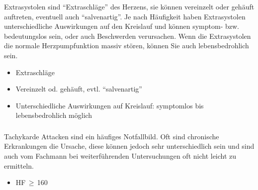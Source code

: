 {%
\label{topic:extrasystolen}
Extrasystolen sind \enquote{Extraschläge} des Herzens, sie können
vereinzelt oder gehäuft auftreten, eventuell auch
\enquote{salvenartig}. Je nach Häufigkeit haben Extrasystolen
unterschiedliche Auswirkungen auf den Kreislauf und können
symptom- bzw. bedeutungslos sein, oder auch Beschwerden
verursachen. Wenn die Extrasystolen die normale
Herzpumpfunktion massiv stören, können Sie auch
lebensbedrohlich sein.
}
{%
\begin{itemize}
  \item Extraschläge
  \item Vereinzelt od. gehäuft, evtl. \enquote{salvenartig}
  \item Unterschiedliche Auswirkungen auf Kreislauf: symptomlos bis
  lebensbedrohlich möglich
\end{itemize}

}{}{}{}





\subsubsection{}
\label{topic:tachykarde-attacke}


\TextSlide{\TxBeschreibung}
{%
Tachykarde Attacken sind ein häufiges Notfallbild. Oft sind
chronische Erkrankungen die Ursache, diese
können jedoch sehr unterschiedlich sein und sind auch vom Fachmann bei weiterführenden Untersuchungen
oft nicht leicht zu ermitteln.
}{
\begin{itemize}
  \item HF\,$\geq$\,160\PerMin*
\end{itemize}
}{}{}{}

